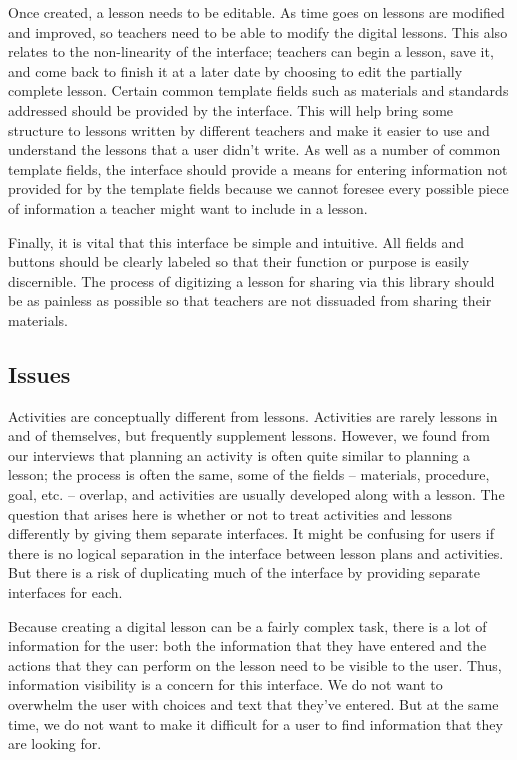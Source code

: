 \documentclass[10pt,letter]{article}
\begin{document}
Once created, a lesson needs to be editable. As time goes on lessons are
modified and improved, so teachers need to be able to modify the digital
lessons. This also relates to the non-linearity of the interface; teachers can
begin a lesson, save it, and come back to finish it at a later date by choosing
to edit the partially complete lesson. Certain common template fields such as
materials and standards addressed should be provided by the interface. This will
help bring some structure to lessons written by different teachers and make it
easier to use and understand the lessons that a user didn't write. As well as
a number of common template fields, the interface should provide a means for
entering information not provided for by the template fields because we cannot
foresee every possible piece of information a teacher might want to include in a
lesson.

Finally, it is vital that this interface be simple and intuitive. All fields and
buttons should be clearly labeled so that their function or purpose is easily
discernible. The process of digitizing a lesson for sharing via this library
should be as painless as possible so that teachers are not dissuaded from
sharing their materials.

\subsection{Issues}
Activities are conceptually different from lessons. Activities are rarely
lessons in and of themselves, but frequently supplement lessons. However,
we found from our interviews that planning an activity is often quite similar to
planning a lesson; the process is often the same, some of the fields --
materials, procedure, goal, etc. -- overlap, and activities are usually
developed along with a lesson. The question that arises here is whether or not
to treat activities and lessons differently by giving them separate interfaces.
It might be confusing for users if there is no logical separation in the
interface between lesson plans and activities. But there is a risk of
duplicating much of the interface by providing separate interfaces for each.

Because creating a digital lesson can be a fairly complex task, there is a lot
of information for the user: both the information that they have entered and the
actions that they can perform on the lesson need to be visible to the user.
Thus, information visibility is a concern for this interface. We do not want to
overwhelm the user with choices and text that they've entered. But at the same
time, we do not want to make it difficult for a user to find information that
they are looking for.
\end{document}
